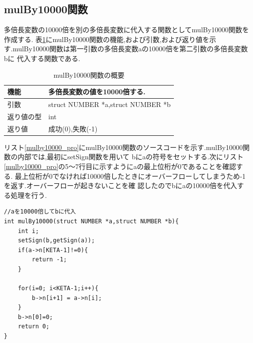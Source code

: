 \documentclass[a4j] {jarticle}
\begin{document}
\subsection{mulBy10000関数}
多倍長変数の10000倍を別の多倍長変数に代入する関数としてmulBy10000関数を作成する.
表\ref{mulBy10000}にmulBy10000関数の機能,および引数,および返り値を示す.mulBy10000関数は第一引数の多倍長変数aの10000倍を第二引数の多倍長変数bに
代入する関数である.
\begin{table}[H]
  \caption{mulBy10000関数の概要}
  \label{mulBy10000}
  \begin{center}
      \begin{tabular}{|l|l|}\hline
      機能 & 多倍長変数の値を10000倍する.\\ \hline
      引数 & struct NUMBER *a,struct NUMBER *b\\ \hline
      返り値の型 & int\\ \hline
      返り値 & 成功(0),失敗(-1)\\ \hline
      \end{tabular}
  \end{center}
  \end{table}

  リスト\ref{mulby10000_pro}にmulBy10000関数のソースコードを示す.mulBy10000関数の内部では,最初にsetSign関数を用いて
  bにaの符号をセットする.次にリスト\ref{mulby10000_pro}の5～7行目に示すようにaの最上位桁が0であることを確認する.
  最上位桁が0でなければ10000倍したときにオーバーフローしてしまうため-1を返す.オーバーフローが起きないことを確
  認したのでbにaの10000倍を代入する処理を行う.
  \begin{lstlisting}[basicstyle=\ttfamily\footnotesize, frame=single,label=mulby10000_pro,caption=mulBy10000関数のソースコード]
//aを10000倍してbに代入
int mulBy10000(struct NUMBER *a,struct NUMBER *b){
    int i;
    setSign(b,getSign(a));
    if(a->n[KETA-1]!=0){
        return -1;
    }

    for(i=0; i<KETA-1;i++){
        b->n[i+1] = a->n[i];
    }
    b->n[0]=0;
    return 0;
}
  \end{lstlisting}
\end{document}
